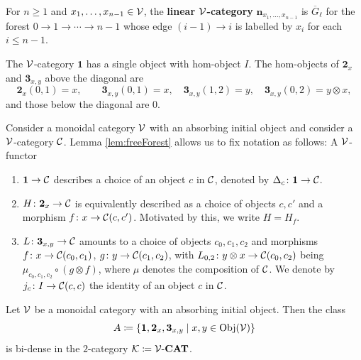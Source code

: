 \begin{definition}\label{def:test_categories_A}
For $n\geq1$ and $x_1,\ldots,x_{n-1}\in\mathcal{V}$, the \textbf{linear $\mathcal{V}$-category} $\mathbf{n}_{x_1,\ldots,x_{n-1}}$ is $\overline{G}_\ell$ for the forest $0\to1\to\cdots\to n-1$ whose edge $(i-1)\to i$ is labelled by $x_i$ for each $i\leq n-1$.
\end{definition}

The $\mathcal{V}$-category $\mathbf{1}$ has a single object with hom-object $I$. The hom-objects of $\mathbf{2}_x$ and $\mathbf{3}_{x,y}$ above the diagonal are
$$
\mathbf{2}_x(0,1)=x,\qquad \mathbf{3}_{x,y}(0,1)=x,\quad \mathbf{3}_{x,y}(1,2)=y,\quad \mathbf{3}_{x,y}(0,2)=y\otimes x,
$$
and those below the diagonal are $0$.

Consider a monoidal category $\mathcal{V}$ with an absorbing initial object and consider a $\mathcal{V}$-category $\mathcal{C}$. Lemma \ref{lem:freeForest} allows us to fix notation as follows: A $\mathcal{V}$-functor
\begin{enumerate}
    \item $\mathbf{1}\to \mathcal{C}$ describes a choice of an object $c$ in $\mathcal{C}$, denoted by $\Delta_c\colon \textbf{1}\to\mathcal{C}$.
    \item $H\colon\mathbf{2}_x\to\mathcal{C}$ is equivalently described as a choice of objects $c,c'$ and a morphism $f\colon x\to\mathcal{C}(c,c')$. Motivated by this, we write $H=H_f$.
    \item $L\colon \mathbf{3}_{x,y}\to\mathcal{C}$ amounts to a choice of objects $c_0,c_1,c_2$ and morphisms $f\colon x\to\mathcal{C}(c_0,c_1)$, $g\colon y\to\mathcal{C}(c_1,c_2)$, with $L_{0,2}\colon y\otimes x\to \mathcal{C}(c_0, c_2)$ being $\mu_{c_0,c_1,c_2}\circ(g\otimes f)$, where $\mu$ denotes the composition of $\mathcal{C}$. We denote by $j_c\colon I\to \mathcal{C}(c,c)$ the identity of an object $c$ in $\mathcal{C}$.
\end{enumerate} 


\begin{theorem}\label{thm:density_of_A_app}
Let $\mathcal{V}$ be a monoidal category with an absorbing initial object. Then the class
$$
A \coloneqq \{\mathbf{1}, \mathbf{2}_x, \mathbf{3}_{x,y} \mid x,y \in \mathrm{Obj}(\mathcal{V})\}
$$
is bi-dense in the $2$-category $\mathcal{K} \coloneqq \mathcal{V}\text{-}\mathbf{CAT}$.
\end{theorem}

